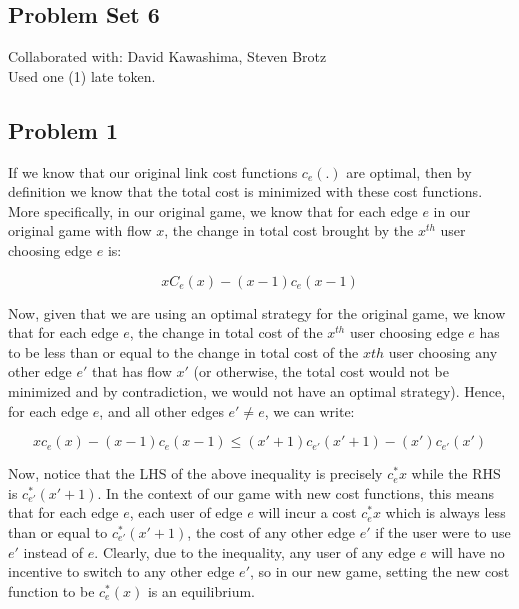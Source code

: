 \documentclass[12 pt]{article}
\begin{document}
	\begin{center}
		\section*{Problem Set 6}
	\end{center}
	
	\noindent Collaborated with: David Kawashima, Steven Brotz\\
	
	\noindent Used one (1) late token. \\
	
	\subsection*{Problem 1}
	
	\noindent If we know that our original link cost functions $c_e(.)$ are optimal, then by definition we know that the total cost is minimized with these cost functions. More specifically, in our original game, we know that for each edge $e$ in our original game with flow $x$, the change in total cost brought by the $x^{th}$ user choosing edge $e$ is:
	
	\[
	xC_e(x) - (x-1)c_e(x-1)
	\]
	
	\noindent Now, given that we are using an optimal strategy for the original game, we know that for each edge $e$, the change in total cost of the $x^{th}$ user choosing edge $e$ has to be less than or equal to the change in total cost of the $x{th}$ user choosing any other edge $e'$ that has flow $x'$ (or otherwise, the total cost would not be minimized and by contradiction, we would not have an optimal strategy). Hence, for each edge $e$, and all other edges $e' \neq e$, we can write:
	
	\[
	xc_e(x) - (x-1)c_e(x-1) \leq (x'+1)c_{e'}(x'+1) - (x')c_{e'}(x')
	\] 
	
	\noindent Now, notice that the LHS of the above inequality is precisely $c_e^{*}x$ while the RHS is $c_{e'}^{*}(x'+1)$. In the context of our game with new cost functions, this means that for each edge $e$, each user of edge $e$ will incur a cost $c_e^{*}x$ which is always less than or equal to $c_{e'}^{*}(x'+1)$, the cost of any other edge $e'$ if the user were to use $e'$ instead of $e$. Clearly, due to the inequality, any user of any edge $e$ will have no incentive to switch to any other edge $e'$, so in our new game, setting the new cost function to be $c_e^*(x)$ is an equilibrium. \\
	
\end{document}
